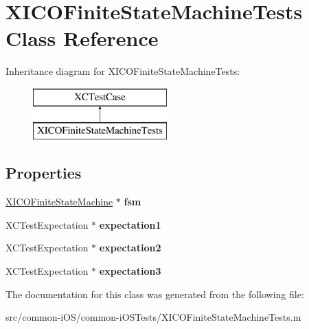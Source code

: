 \hypertarget{interface_x_i_c_o_finite_state_machine_tests}{}\section{X\+I\+C\+O\+Finite\+State\+Machine\+Tests Class Reference}
\label{interface_x_i_c_o_finite_state_machine_tests}
Inheritance diagram for X\+I\+C\+O\+Finite\+State\+Machine\+Tests\+:\begin{figure}[H]
\begin{center}
\leavevmode
\includegraphics[height=2.000000cm]{interface_x_i_c_o_finite_state_machine_tests}
\end{center}
\end{figure}
\subsection*{Properties}
\begin{DoxyCompactItemize}
\item 
\hypertarget{interface_x_i_c_o_finite_state_machine_tests_ac7f250b968813bcd158ed30ecb79ea65}{}\label{interface_x_i_c_o_finite_state_machine_tests_ac7f250b968813bcd158ed30ecb79ea65} 
\hyperlink{class_x_i_c_o_finite_state_machine}{X\+I\+C\+O\+Finite\+State\+Machine} $\ast$ {\bfseries fsm}
\item 
\hypertarget{interface_x_i_c_o_finite_state_machine_tests_a8bf82cb565ee8d008fc4d74c0901d4dd}{}\label{interface_x_i_c_o_finite_state_machine_tests_a8bf82cb565ee8d008fc4d74c0901d4dd} 
X\+C\+Test\+Expectation $\ast$ {\bfseries expectation1}
\item 
\hypertarget{interface_x_i_c_o_finite_state_machine_tests_a65288bf258f3e69e55d4fdf0bc25bce2}{}\label{interface_x_i_c_o_finite_state_machine_tests_a65288bf258f3e69e55d4fdf0bc25bce2} 
X\+C\+Test\+Expectation $\ast$ {\bfseries expectation2}
\item 
\hypertarget{interface_x_i_c_o_finite_state_machine_tests_a4910ea9f62be92076bb3b330e96d2c45}{}\label{interface_x_i_c_o_finite_state_machine_tests_a4910ea9f62be92076bb3b330e96d2c45} 
X\+C\+Test\+Expectation $\ast$ {\bfseries expectation3}
\end{DoxyCompactItemize}


The documentation for this class was generated from the following file\+:\begin{DoxyCompactItemize}
\item 
src/common-\/i\+O\+S/common-\/i\+O\+S\+Tests/X\+I\+C\+O\+Finite\+State\+Machine\+Tests.\+m\end{DoxyCompactItemize}
